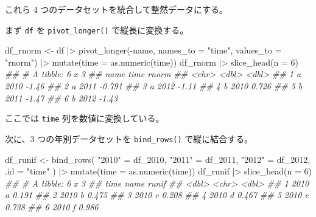 \documentclass[
  letterpaper,
  xelatex,
  ja=standard, xelatex]{bxjsbook}
\newenvironment{Shaded}{\begin{snugshade}}{\end{snugshade}}
\newcommand{\AttributeTok}[1]{\textcolor[rgb]{0.40,0.45,0.13}{#1}}
\newcommand{\DecValTok}[1]{\textcolor[rgb]{0.68,0.00,0.00}{#1}}
\newcommand{\DocumentationTok}[1]{\textcolor[rgb]{0.37,0.37,0.37}{\textit{#1}}}
\newcommand{\FunctionTok}[1]{\textcolor[rgb]{0.28,0.35,0.67}{#1}}
\newcommand{\NormalTok}[1]{\textcolor[rgb]{0.00,0.23,0.31}{#1}}
\newcommand{\OtherTok}[1]{\textcolor[rgb]{0.00,0.23,0.31}{#1}}
\newcommand{\SpecialCharTok}[1]{\textcolor[rgb]{0.37,0.37,0.37}{#1}}
\newcommand{\StringTok}[1]{\textcolor[rgb]{0.13,0.47,0.30}{#1}}
\begin{document}
これら 4 つのデータセットを統合して整然データにする。

まず \texttt{df} を \texttt{pivot\_longer()} で縦長に変換する。

\begin{Shaded}
\begin{Highlighting}[]
\NormalTok{df\_rnorm }\OtherTok{\textless{}{-}}\NormalTok{ df }\SpecialCharTok{|\textgreater{}} 
  \FunctionTok{pivot\_longer}\NormalTok{(}\SpecialCharTok{{-}}\NormalTok{name, }\AttributeTok{names\_to =} \StringTok{"time"}\NormalTok{, }\AttributeTok{values\_to =} \StringTok{"rnorm"}\NormalTok{) }\SpecialCharTok{|\textgreater{}} 
  \FunctionTok{mutate}\NormalTok{(}\AttributeTok{time =} \FunctionTok{as.numeric}\NormalTok{(time))}
\NormalTok{df\_rnorm }\SpecialCharTok{|\textgreater{}} \FunctionTok{slice\_head}\NormalTok{(}\AttributeTok{n =} \DecValTok{6}\NormalTok{)}
\DocumentationTok{\#\# \# A tibble: 6 x 3}
\DocumentationTok{\#\#   name   time  rnorm}
\DocumentationTok{\#\#   \textless{}chr\textgreater{} \textless{}dbl\textgreater{}  \textless{}dbl\textgreater{}}
\DocumentationTok{\#\# 1 a      2010 {-}1.46 }
\DocumentationTok{\#\# 2 a      2011 {-}0.791}
\DocumentationTok{\#\# 3 a      2012 {-}1.11 }
\DocumentationTok{\#\# 4 b      2010  0.726}
\DocumentationTok{\#\# 5 b      2011 {-}1.47 }
\DocumentationTok{\#\# 6 b      2012 {-}1.43}
\end{Highlighting}
\end{Shaded}

ここでは \texttt{time} 列を数値に変換している。

次に、3 つの年別データセットを \texttt{bind\_rows()} で縦に結合する。

\begin{Shaded}
\begin{Highlighting}[]
\NormalTok{df\_runif }\OtherTok{\textless{}{-}} \FunctionTok{bind\_rows}\NormalTok{(}
  \StringTok{"2010"} \OtherTok{=}\NormalTok{ df\_2010,}
  \StringTok{"2011"} \OtherTok{=}\NormalTok{ df\_2011,}
  \StringTok{"2012"} \OtherTok{=}\NormalTok{ df\_2012,}
  \AttributeTok{.id    =} \StringTok{"time"}
\NormalTok{) }\SpecialCharTok{|\textgreater{}} 
  \FunctionTok{mutate}\NormalTok{(}\AttributeTok{time =} \FunctionTok{as.numeric}\NormalTok{(time))}
\NormalTok{df\_runif }\SpecialCharTok{|\textgreater{}} \FunctionTok{slice\_head}\NormalTok{(}\AttributeTok{n =} \DecValTok{6}\NormalTok{)}
\DocumentationTok{\#\# \# A tibble: 6 x 3}
\DocumentationTok{\#\#    time name  runif}
\DocumentationTok{\#\#   \textless{}dbl\textgreater{} \textless{}chr\textgreater{} \textless{}dbl\textgreater{}}
\DocumentationTok{\#\# 1  2010 a     0.191}
\DocumentationTok{\#\# 2  2010 b     0.475}
\DocumentationTok{\#\# 3  2010 c     0.208}
\DocumentationTok{\#\# 4  2010 d     0.467}
\DocumentationTok{\#\# 5  2010 e     0.738}
\DocumentationTok{\#\# 6  2010 f     0.986}
\end{Highlighting}
\end{Shaded}
\end{document}
